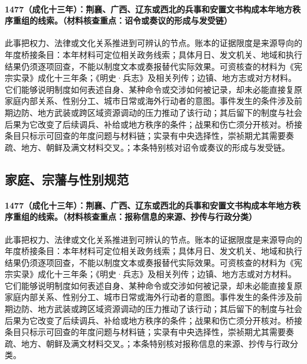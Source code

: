 \paragraph{1477（成化十三年）：荆襄、广西、辽东或西北的兵事和安置文书构成本年地方秩序重组的线索。（材料核查重点：诏令或奏议的形成与发受链）} 此事把权力、法律或文化关系推进到可辨认的节点。账本的证据限度是来源导向的年度桥接条目：本年材料可定位相关政务线索；具体月日、发文机关、地域和执行结果仍须逐项回查，不能以制度文本或奏报替代实际效果。可资核查的材料为《宪宗实录》成化十三年条；《明史·兵志》及相关列传；边镇、地方志或对方材料。它们能够说明制度如何表述自身、某种命令或交涉如何被记录，却未必能直接复原家庭内部关系、性别分工、城市日常或海外行动者的意图。事件发生的条件涉及前期边防、地方武装或跨区域资源调动的压力推动了该行动；其后留下的制度与社会后果为它改变了后续调兵、补给或地方秩序的条件；战果和伤亡须分开核对。桥接条目只标示可回查的年度问题与材料链；实录有中央选择性，崇祯期尤其需要奏疏、地方、朝鲜及满文材料交叉。；本条特别核对诏令或奏议的形成与发受链。

\subsection{家庭、宗藩与性别规范}

\paragraph{1477（成化十三年）：荆襄、广西、辽东或西北的兵事和安置文书构成本年地方秩序重组的线索。（材料核查重点：报称信息的来源、抄传与行政分类）} 此事把权力、法律或文化关系推进到可辨认的节点。账本的证据限度是来源导向的年度桥接条目：本年材料可定位相关政务线索；具体月日、发文机关、地域和执行结果仍须逐项回查，不能以制度文本或奏报替代实际效果。可资核查的材料为《宪宗实录》成化十三年条；《明史·兵志》及相关列传；边镇、地方志或对方材料。它们能够说明制度如何表述自身、某种命令或交涉如何被记录，却未必能直接复原家庭内部关系、性别分工、城市日常或海外行动者的意图。事件发生的条件涉及前期边防、地方武装或跨区域资源调动的压力推动了该行动；其后留下的制度与社会后果为它改变了后续调兵、补给或地方秩序的条件；战果和伤亡须分开核对。桥接条目只标示可回查的年度问题与材料链；实录有中央选择性，崇祯期尤其需要奏疏、地方、朝鲜及满文材料交叉。；本条特别核对报称信息的来源、抄传与行政分类。

